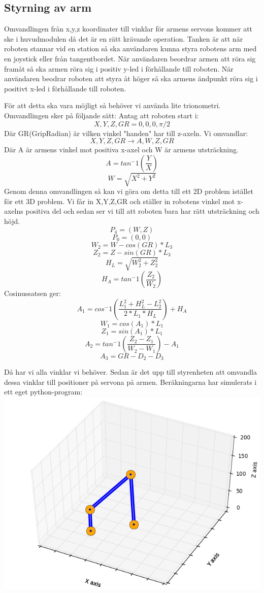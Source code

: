  \subsection{Styrning av arm}
 Omvandlingen från x,y,z koordinater till vinklar för armens servons kommer att ske i huvudmodulen då det är en rätt krävande operation. Tanken är att när roboten stannar vid en station så ska användaren kunna styra robotens arm med en joystick eller från tangentbordet. När användaren beordrar armen att röra sig framåt så ska armen röra sig i positiv y-led i förhållande till roboten. När användaren beodrar roboten att styra åt höger så ska armens ändpunkt röra sig i positivt x-led i förhållande till roboten.
 \newline
 \centerline{}
\centerline{}
\newline
 För att detta ska vara möjligt så behöver vi använda lite trionometri. Omvandlingen sker på följande sätt:
Antag att roboten start i: $$X,Y,Z,GR=0,0,0,\pi/2$$
Där GR(GripRadian) är vilken vinkel "handen" har till z-axeln.\newline
Vi omvandlar:$$ X,Y,Z,GR\rightarrow A,W,Z,GR$$ 
Där A är armens vinkel mot positiva x-axel och W är armens utsträckning.
$$A=tan^-1(\dfrac{Y}{X}) $$
$$W=\sqrt{X^2+Y^2}$$
Genom denna omvandlingen så kan vi göra om detta till ett 2D problem istället för ett 3D problem. Vi får in X,Y,Z,GR och ställer in robotens vinkel mot x-axelns positiva del och sedan ser vi till att roboten bara har rätt utsträckning och höjd.
$$P_4=(W,Z)$$
$$P_0=(0,0)$$
$$W_2=W-cos(GR)*L_3$$
$$Z_2=Z-sin(GR)*L_3$$
$$H_L=\sqrt{W_2^2+Z_2^2}$$
$$H_A=tan^-1(\dfrac{Z_2}{W_2})$$
Cosinussatsen ger:
$$A_1=cos^-1(\dfrac{L_1^2+H_L^2-L_2^2}{2*L_1*H_L})+H_A$$
$$W_1=cos(A_1)*L_1$$
$$Z_1=sin(A_1)*L_1$$
$$A_2=tan^-1(\dfrac{Z_2-Z_1}{W_2-W_1})-A_1$$
$$A_3=GR-D_2-D_3$$

Då har vi alla vinklar vi behöver. Sedan är det upp till styrenheten att omvandla dessa vinklar till positioner på servona på armen.
Beräkningarna har simulerats i ett eget python-program:
\includegraphics[scale=0.6]{simulator}
